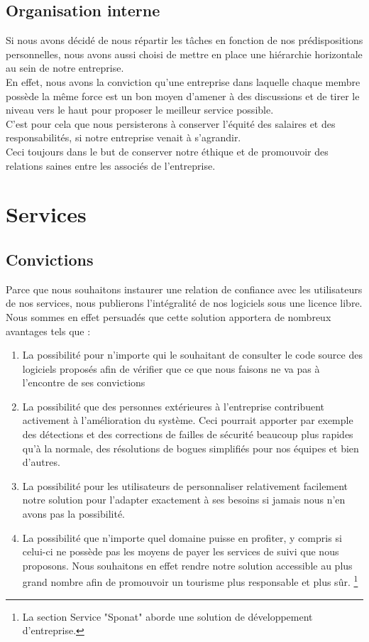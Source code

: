 {\section{Organisation interne}

Si nous avons décidé de nous répartir les tâches en fonction de nos prédispositions personnelles, nous avons aussi choisi de mettre en place une hiérarchie horizontale au sein de notre entreprise.\\
En effet, nous avons la conviction qu'une entreprise dans laquelle chaque membre possède la même force est un bon moyen d'amener à des discussions et de tirer le niveau vers le haut pour proposer le meilleur service possible. \\
C'est pour cela que nous persisterons à conserver l'équité des salaires et des responsabilités, si notre entreprise venait à s'agrandir.\\
Ceci toujours dans le but de conserver notre éthique et de promouvoir des relations saines entre les associés de l'entreprise.


\chapter{Services}

\section{Convictions}

Parce que nous souhaitons instaurer une relation de confiance avec les utilisateurs de nos services, nous publierons l'intégralité de nos logiciels sous une licence libre.\n
Nous sommes en effet persuadés que cette solution apportera de nombreux avantages tels que :
\begin{enumerate}
    \item La possibilité pour n'importe qui le souhaitant de consulter le code source des logiciels proposés afin de vérifier que ce que nous faisons ne va pas à l'encontre de ses convictions
    \item La possibilité que des personnes extérieures à l'entreprise contribuent activement à l'amélioration du système. Ceci pourrait apporter par exemple des détections et des corrections de failles de sécurité beaucoup plus rapides qu'à la normale, des résolutions de bogues simplifiés pour nos équipes et bien d'autres.
    \item La possibilité pour les utilisateurs de personnaliser relativement facilement notre solution pour l'adapter exactement à ses besoins si jamais nous n'en avons pas la possibilité.
    \item La possibilité que n'importe quel domaine puisse en profiter, y compris si celui-ci ne possède pas les moyens de payer les services de suivi que nous proposons. Nous souhaitons en effet rendre notre solution accessible au plus grand nombre afin de promouvoir un tourisme plus responsable et plus sûr. \footnote{La section Service "Sponat" aborde une solution de développement d'entreprise.}
\end{enumerate}

}
